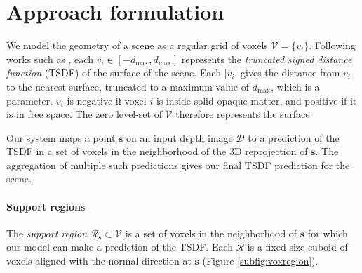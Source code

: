 \documentclass[10pt,twocolumn,letterpaper]{article}
\newcommand{\rgbdimage}{\mathcal{D}}
\newcommand{\pixelidx}{\mathbf{s}}
\newcommand{\voxelgrid}{\mathcal{V}}
\newcommand{\voxel}{v}
\newcommand{\voxidx}{i}
\newcommand{\project}{\mathbf{p}}
\begin{document}
\section{Approach formulation}


We model the geometry of a scene as a regular grid of voxels $\voxelgrid = \{\voxel_\voxidx\}$.
Following works such as \cite{izadi-uist-2011, prisacariu-iccv-2011}, each $\voxel_\voxidx \in [-d_{\max}, d_{\max}]$ represents the \emph{truncated signed distance function} (TSDF) of the surface of the scene.
Each $|\voxel_\voxidx|$ gives the distance from $\voxel_\voxidx$ to the nearest surface, truncated to a maximum value of $d_{\max}$, which is a parameter. 
$\voxel_\voxidx$ is negative if voxel $\voxidx$ is inside solid opaque matter, and positive if it is in free space. 
The zero level-set of $\voxelgrid$ therefore represents the surface.

\newcommand{\voxregion}{\mathcal{R}}

Our system maps a point $\pixelidx$ on an input depth image $\rgbdimage$ to a prediction of the TSDF in a set of voxels in the neighborhood of the 3D reprojection of $\pixelidx$.
The aggregation of multiple such predictions gives our final TSDF prediction for the scene.




\paragraph{Support regions}
The \emph{support region} $\voxregion_\pixelidx \subset \voxelgrid$ is a set of voxels in the neighborhood of $\pixelidx$ for which our model can make a prediction of the TSDF.
Each $\voxregion$ is a fixed-size cuboid of voxels aligned with the normal direction at $\pixelidx$ (Figure \ref{subfig:voxregion}).
\end{document}
